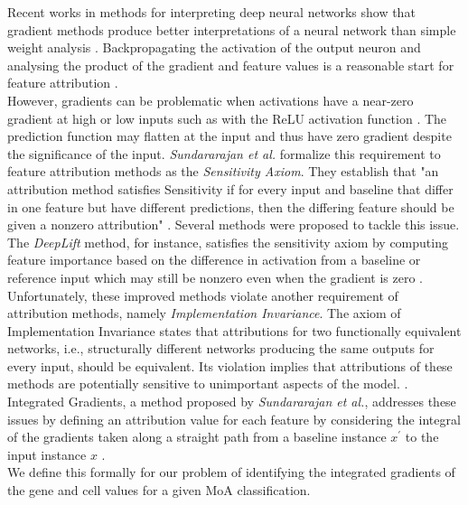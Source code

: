\documentclass[bsc,frontabs,twoside,singlespacing,parskip,deptreport]{infthesis}     %
\begin{document}
Recent works in methods for interpreting deep neural networks show that gradient methods produce better interpretations of a neural network than simple weight analysis \cite{montavon_methods_2018}. Backpropagating the activation of the output neuron and analysing the product of the gradient and feature values is a reasonable start for feature attribution \cite{baehrens_how_nodate}.\\
However, gradients can be problematic when activations have a near-zero gradient at high or low inputs such as with the ReLU activation function \cite{shrikumar_not_2017}. The prediction function may flatten at the input and thus have zero gradient despite the significance of the input.
\textit{Sundararajan et al.} \cite{sundararajan_axiomatic_2017} formalize this requirement to feature attribution methods as the \textit{Sensitivity Axiom}. They establish that "an attribution method satisfies Sensitivity if for every input and baseline that differ in one feature but have different predictions, then the differing feature should be given a nonzero attribution" \cite{sundararajan_axiomatic_2017}.
Several methods were proposed to tackle this issue. The \textit{DeepLift} method, for instance, satisfies the sensitivity axiom by computing feature importance based on the difference in activation from a baseline or reference input which may still be nonzero even when the gradient is zero \cite{sundararajan_axiomatic_2017}.\\
Unfortunately, these improved methods violate another requirement of attribution methods, namely \textit{Implementation Invariance}. The axiom of Implementation Invariance states that attributions for two functionally equivalent networks, i.e., structurally different networks producing the same outputs for every input, should be equivalent. Its violation implies that attributions of these methods are potentially sensitive to unimportant aspects of the model. \cite{sundararajan_axiomatic_2017}. \\
Integrated Gradients, a method proposed by \textit{Sundararajan et al.}, addresses these issues by defining an attribution value for each feature by considering the integral of the gradients taken along a straight path from a baseline instance \(x^{\prime}\) to the input instance \(x\) \cite{sundararajan_axiomatic_2017}. \\

We define this formally for our problem of identifying the integrated gradients of the gene and cell values for a given MoA classification.
\end{document}
